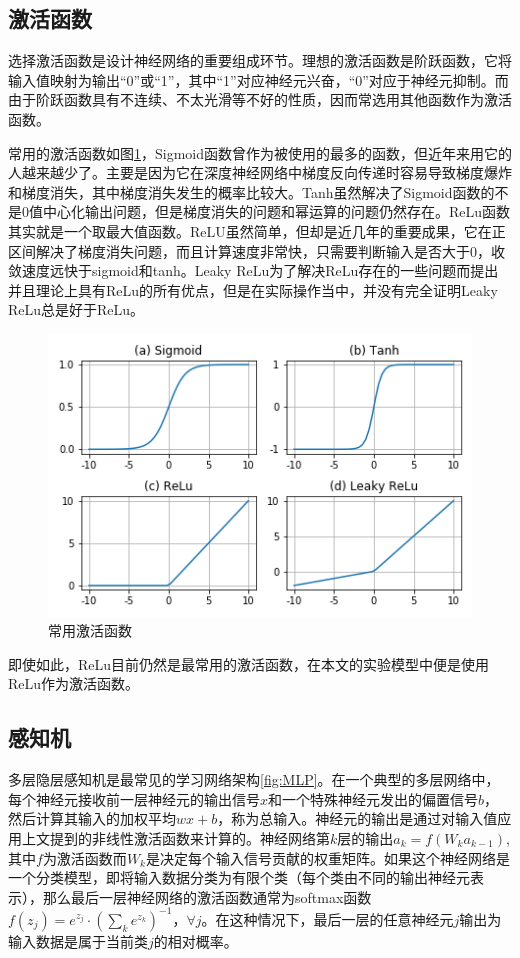 \documentclass[zihao = -4,cn]{oucart}
\begin{document}
\subsection{激活函数}
选择激活函数是设计神经网络的重要组成环节。理想的激活函数是阶跃函数，它将输入值映射为输出“0”或“1”，其中“1”对应神经元兴奋，“0”对应于神经元抑制。而由于阶跃函数具有不连续、不太光滑等不好的性质，因而常选用其他函数作为激活函数。\par
常用的激活函数如图\ref{fig:actfunc}，Sigmoid函数曾作为被使用的最多的函数，但近年来用它的人越来越少了。主要是因为它在深度神经网络中梯度反向传递时容易导致梯度爆炸和梯度消失，其中梯度消失发生的概率比较大。Tanh虽然解决了Sigmoid函数的不是0值中心化输出问题，但是梯度消失的问题和幂运算的问题仍然存在。ReLu函数其实就是一个取最大值函数。ReLU虽然简单，但却是近几年的重要成果，它在正区间解决了梯度消失问题，而且计算速度非常快，只需要判断输入是否大于0，收敛速度远快于sigmoid和tanh。Leaky ReLu为了解决ReLu存在的一些问题而提出并且理论上具有ReLu的所有优点，但是在实际操作当中，并没有完全证明Leaky ReLu总是好于ReLu。\par
\begin{figure}[h]
	\centering %
	\includegraphics[scale=0.8]{assets/actfunc}
	\caption{常用激活函数}
	\label{fig:actfunc}
\end{figure}
即使如此，ReLu目前仍然是最常用的激活函数，在本文的实验模型中便是使用ReLu作为激活函数。

\subsection{感知机}
多层隐层感知机是最常见的学习网络架构\ref{fig:MLP}。在一个典型的多层网络中，每个神经元接收前一层神经元的输出信号$x$和一个特殊神经元发出的偏置信号$b$，然后计算其输入的加权平均$wx+b$，称为总输入。神经元的输出是通过对输入值应用上文提到的非线性激活函数来计算的。神经网络第$k$层的输出$a_k = f(W_ka_{k-1})$,其中$f$为激活函数而$W_k$是决定每个输入信号贡献的权重矩阵。如果这个神经网络是一个分类模型，即将输入数据分类为有限个类（每个类由不同的输出神经元表示），那么最后一层神经网络的激活函数通常为softmax函数$f(z_j)=e^{z_j}\cdot(\sum_k{e^{z_k}})^{-1}$，$\forall{j}$。在这种情况下，最后一层的任意神经元$j$输出为输入数据是属于当前类$j$的相对概率。\par
\end{document}
